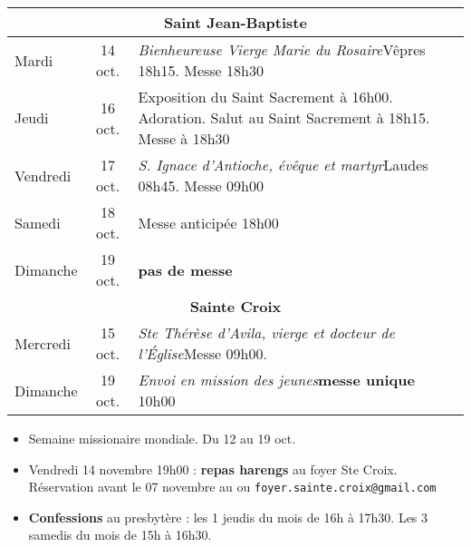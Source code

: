 \documentclass[french,11pt]{article}
\begin{document}
\begin{tabular} {lcp{9cm}}
\multicolumn{3}{c}{\textbf{Saint Jean-Baptiste} } \\ \hline
Mardi    & 14 oct.  &\emph{Bienheureuse Vierge Marie du Rosaire}\newline  Vêpres 18h15. Messe 18h30 \\ \hline
Jeudi    & 16 oct. &
Exposition du Saint Sacrement à 16h00. Adoration. Salut au Saint Sacrement à 18h15. Messe à 18h30 
 \\ \hline
Vendredi & 17 oct. & \emph{S. Ignace d'Antioche, évêque et martyr}\newline Laudes 08h45. Messe 09h00 \\ \hline
Samedi   & 18 oct. & Messe anticipée 18h00 \\ \hline
Dimanche  & 19 oct. & \textbf{pas de messe}\\ \hline
\multicolumn{3}{c}{\textbf{Sainte Croix} } \\ \hline
Mercredi & 15 oct.  & \emph{Ste Thérèse d'Avila, vierge et docteur de l'Église}\newline Messe 09h00. \\ \hline
Dimanche  & 19 oct. & \emph{Envoi en mission des jeunes}\newline \textbf{messe unique} 10h00\\ \hline
\end{tabular}

\begin{framed}
\begin{itemize}
\item
Semaine missionaire mondiale. Du 12 au 19 oct.
\item Vendredi 14 novembre 19h00 : \textbf{repas harengs} au foyer Ste Croix. Réservation avant le 07 novembre au  ou \texttt{foyer.sainte.croix@gmail.com}
\item
\textbf{Confessions} au presbytère : les 1\iers{} jeudis du mois de 16h à 17h30. Les 3\iemes{} samedis du mois de 15h à 16h30.
\end{itemize}
\end{framed}
\end{document}

